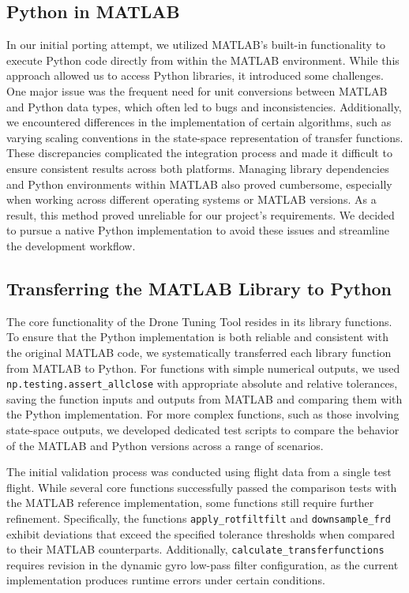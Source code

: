 \documentclass[a4paper,11pt]{scrartcl}
\begin{document}
\subsection{Python in MATLAB}

In our initial porting attempt, we utilized MATLAB's built-in functionality to execute Python code directly from within the MATLAB environment.
While this approach allowed us to access Python libraries, it introduced some challenges.
One major issue was the frequent need for unit conversions between MATLAB and Python data types, which often led to  bugs and inconsistencies.
Additionally, we encountered differences in the implementation of certain algorithms, such as varying scaling conventions in the state-space representation of transfer functions.
These discrepancies complicated the integration process and made it difficult to ensure consistent results across both platforms.
Managing library dependencies and Python environments within MATLAB also proved cumbersome, especially when working across different operating systems or MATLAB versions.
As a result, this method proved unreliable for our project's requirements.
We decided to pursue a native Python implementation to avoid these issues and streamline the development workflow.

\subsection{Transferring the MATLAB Library to Python}

The core functionality of the Drone Tuning Tool resides in its library functions.
To ensure that the Python implementation is both reliable and consistent with the original MATLAB code, we systematically transferred each library function from MATLAB to Python.
For functions with simple numerical outputs, we used \texttt{np.testing.assert\_allclose} with appropriate absolute and relative tolerances, saving the function inputs and outputs from MATLAB and comparing them with the Python implementation.
For more complex functions, such as those involving state-space outputs, we developed dedicated test scripts to compare the behavior of the MATLAB and Python versions across a range of scenarios.

The initial validation process was conducted using flight data from a single test flight.
While several core functions successfully passed the comparison tests with the MATLAB reference implementation, some functions still require further refinement.
Specifically, the functions \texttt{apply\_rotfiltfilt} and \texttt{downsample\_frd} exhibit deviations that exceed the specified tolerance thresholds when compared to their MATLAB counterparts.
Additionally, \texttt{calculate\_transferfunctions} requires revision in the dynamic gyro low-pass filter configuration, as the current implementation produces runtime errors under certain conditions.
\end{document}
